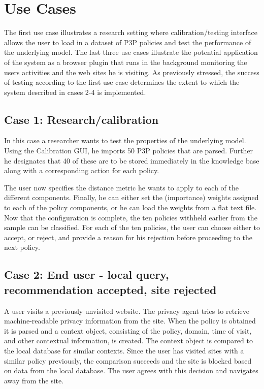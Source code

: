 \section{Use Cases}\label{useCase}

The first use case illustrates a research setting where calibration/testing interface allows the user to load in a dataset of P3P policies and test the performance of the underlying model. The last three use cases illustrate the potential application of the system as a browser plugin that runs in the background monitoring the users activities and the web sites he is visiting. As previously stressed, the success of testing according to the first use case determines the extent to which the system described in cases 2-4 is implemented.

\subsection*{Case 1: Research/calibration}
In this case a researcher wants to test the properties of the underlying model. Using the Calibration GUI, he imports 50 P3P policies that are parsed. Further he designates that 40 of these are to be stored immediately in the knowledge base along with a corresponding action for each policy.

The user now specifies the distance metric he wants to apply to each of the different components. Finally, he can either set the (importance) weights assigned to each of the policy components, or he can load the weights from a flat text file. Now that the configuration is complete, the ten policies withheld earlier from the sample can be classified. For each of the ten policies, the user can choose either to accept, or reject, and provide a reason for his rejection before proceeding to the next policy. 

\subsection*{Case 2: End user - local query, recommendation accepted, site rejected}
A user visits a previously unvisited website. The privacy agent tries to retrieve machine-readable privacy information from the site. When the policy is obtained it is parsed and a context object, consisting of the policy, domain, time of visit, and other contextual information, is created. The context object is compared to the local database for similar contexts. Since the user has visited sites with a similar policy previously, the comparison succeeds and the site is blocked based on data from the local database. The user agrees with this decision and navigates away from the site.

